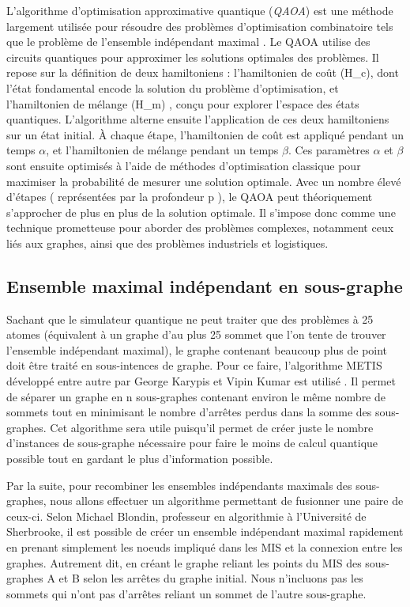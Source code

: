 \documentclass[11pt]{article}
\begin{document}
 L'algorithme d'optimisation approximative quantique (\textit{QAOA}) est une méthode largement utilisée pour résoudre des problèmes d'optimisation combinatoire tels que le problème de l'ensemble indépendant maximal \cite{farhi_quantum_2014}. Le QAOA utilise des circuits quantiques pour approximer les solutions optimales des problèmes. Il repose sur la définition de deux hamiltoniens : l'hamiltonien de coût (H\_c), dont l'état fondamental encode la solution du problème d’optimisation, et l'hamiltonien de mélange (H\_m) , conçu pour explorer l'espace des états quantiques. 
 L'algorithme alterne ensuite l'application de ces deux hamiltoniens sur un état initial. À chaque étape, l'hamiltonien de coût est appliqué pendant un temps $\alpha$, et l'hamiltonien de mélange pendant un temps $\beta$.  Ces paramètres $\alpha$ et $\beta$ sont ensuite optimisés à l'aide de méthodes d'optimisation classique pour maximiser la probabilité de mesurer une solution optimale.
 Avec un nombre élevé d'étapes ( représentées par la profondeur p ), le QAOA peut théoriquement s'approcher de plus en plus de la solution optimale. Il s'impose donc comme une technique prometteuse pour aborder des problèmes complexes, notamment ceux liés aux graphes, ainsi que des problèmes industriels et logistiques.


\subsection{Ensemble maximal indépendant en sous-graphe}
Sachant que le simulateur quantique ne peut traiter que des problèmes à 25 atomes (équivalent à un graphe d'au plus 25 sommet que l'on tente de trouver l'ensemble indépendant maximal), le graphe contenant beaucoup plus de point doit être traité en sous-intences de graphe. Pour ce faire, l'algorithme METIS développé entre autre par George Karypis et Vipin Kumar est utilisé \cite{karypis_multilevelk-way_1998}. Il permet de séparer un graphe en n sous-graphes contenant environ le même nombre de sommets tout en minimisant le nombre d'arrêtes perdus dans la somme des sous-graphes. Cet algorithme sera utile puisqu'il permet de créer juste le nombre d'instances de sous-graphe nécessaire pour faire le moins de calcul quantique possible tout en gardant le plus d'information possible. 

Par la suite, pour recombiner les ensembles indépendants maximals des sous-graphes, nous allons effectuer un algorithme permettant de fusionner une paire de ceux-ci. Selon Michael Blondin, professeur en algorithmie à l'Université de Sherbrooke, il est possible de créer un ensemble indépendant maximal rapidement en prenant simplement les noeuds impliqué dans les MIS et la connexion entre les graphes. Autrement dit, en créant le graphe reliant les points du MIS des sous-graphes A et B selon les arrêtes du graphe initial. Nous n'incluons pas les sommets qui n'ont pas d'arrêtes reliant un sommet de l'autre sous-graphe.
\end{document}
